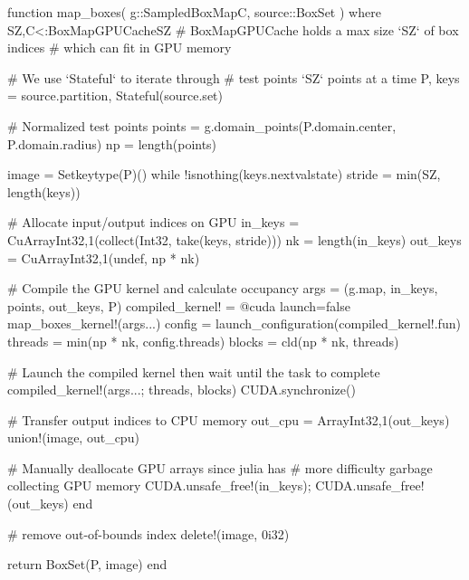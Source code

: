\begin{jllisting}[float, floatplacement=hb!, language=julia, style=jlcodestyle, label=lst:boxmap_gpu, captionpos=b, caption=Function to calculate $f(\mathcal{B})$ with GPU acceleration]
    function map_boxes(
            g::SampledBoxMap{C}, source::BoxSet
        ) where {SZ,C<:BoxMapGPUCache{SZ}}
        # BoxMapGPUCache holds a max size `SZ` of box indices 
        # which can fit in GPU memory

        # We use `Stateful` to iterate through
        # test points `SZ` points at a time
        P, keys = source.partition, Stateful(source.set)

        # Normalized test points
        points = g.domain_points(P.domain.center, P.domain.radius)
        np = length(points)

        image = Set{keytype(P)}()
        while !isnothing(keys.nextvalstate)
            stride = min(SZ, length(keys))

            # Allocate input/output indices on GPU
            in_keys = CuArray{Int32,1}(collect(Int32, take(keys, stride)))
            nk = length(in_keys)
            out_keys = CuArray{Int32,1}(undef, np * nk)

            # Compile the GPU kernel and calculate occupancy
            args = (g.map, in_keys, points, out_keys, P)
            compiled_kernel! = @cuda launch=false map_boxes_kernel!(args...)
            config  = launch_configuration(compiled_kernel!.fun)
            threads = min(np * nk, config.threads)
            blocks  = cld(np * nk, threads)

            # Launch the compiled kernel then wait until the task to complete
            compiled_kernel!(args...; threads, blocks)
            CUDA.synchronize()
            
            # Transfer output indices to CPU memory
            out_cpu = Array{Int32,1}(out_keys)
            union!(image, out_cpu)

            # Manually deallocate GPU arrays since julia has 
            # more difficulty garbage collecting GPU memory
            CUDA.unsafe_free!(in_keys); CUDA.unsafe_free!(out_keys)
        end

        # remove out-of-bounds index
        delete!(image, 0i32)

        return BoxSet(P, image)
    end
\end{jllisting}

\clearpage

